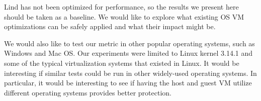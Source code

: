 
Lind has not been optimized for performance, so the results we present here should be taken as a baseline.
We would like to explore what existing OS VM optimizations can be safely applied
and what their impact might be.

We would also like to test our metric in other popular operating systems, such as Windows and Mac OS. 
Our experiments were limited to Linux kernel 3.14.1 and some of the typical virtualization systems that existed in Linux. 
It would be interesting
if similar tests could be run in other widely-used operating systems. In particular, it would be interesting to see if 
having the host and guest VM utilize different operating systems provides better protection. 
